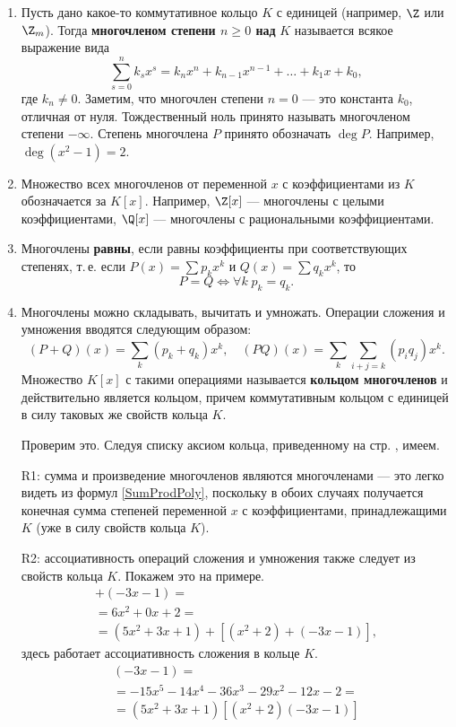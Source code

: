 \label{MNCHL}



\begin{enumerate}
\item Пусть дано какое-то коммутативное кольцо $K$ с единицей (например, $\Z$ или $\Z_m$). Тогда \textbf{многочленом степени $n\ge 0$ над} $K$ называется всякое выражение вида
$$
\sum_{s=0}^n k_sx^s = k_nx^n+k_{n-1}x^{n-1}+\dots+k_1x+k_0,
$$
где $k_n\ne 0$. Заметим, что многочлен степени $n=0$ --- это константа $k_0$, отличная от нуля. Тождественный ноль принято называть многочленом степени $-\infty$. Степень многочлена $P$ принято обозначать $\deg P$. Например, $\deg(x^2-1)=2$.
\item Множество всех многочленов от переменной $x$ с коэффициентами из $K$ обозначается за $K[x]$.
Например, $\Z[x]$ --- многочлены с целыми коэффициентами, $\Q[x]$ --- многочлены с рациональными коэффициентами.
\item Многочлены \textbf{равны}, если равны коэффициенты при соответствующих степенях, т.\,е. если $P(x)=\sum p_kx^k$ и $Q(x)=\sum q_kx^k$,
то
$$
P=Q\Leftrightarrow \forall k \; p_k=q_k.
$$
\item Многочлены можно складывать, вычитать и умножать. Операции сложения и умножения вводятся следующим образом:
\begin{equation}\label{SumProdPoly}
(P+Q)(x) = \sum_k(p_k+q_k)x^k,\quad (PQ)(x) = \sum_k\sum_{i+j=k}(p_iq_j)x^k.
\end{equation}
Множество $K[x]$ с такими операциями называется \textbf{кольцом многочленов} и действительно является кольцом, причем коммутативным кольцом с единицей в силу таковых же свойств кольца $K$.

Проверим это. Следуя списку аксиом кольца, приведенному на стр. \pageref{Ring}, имеем.

R1: сумма и произведение многочленов являются многочленами --- это легко видеть из формул \eqref{SumProdPoly}, поскольку в обоих случаях получается конечная сумма степеней переменной $x$ с коэффициентами, принадлежащими $K$ (уже в силу свойств кольца $K$).

R2: ассоциативность операций сложения и умножения также следует из свойств кольца $K$. Покажем это на примере.
\begin{multline*}
[(5x^2+3x+1)+(x^2+2)]+(-3x-1) = \\
= 6x^2 + 0x + 2  = \\
= (5x^2+3x+1)+[(x^2+2)+(-3x-1)],
\end{multline*}
здесь работает ассоциативность сложения в кольце $K$.
\begin{multline*}
[(5x^2+3x+1)(x^2+2)](-3x-1) = \\
= -15x^5-14x^4-36x^3-29x^2-12x-2 = \\
= (5x^2+3x+1)[(x^2+2)(-3x-1)]
\end{multline*}


\end{enumerate}
